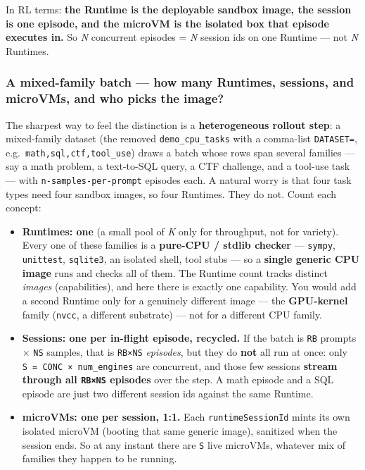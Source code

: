 \documentclass[
  paper=a4,
  ,captions=tableheading
]{scrartcl}
\providecommand{\tightlist}{%
  \setlength{\itemsep}{0pt}\setlength{\parskip}{0pt}}
\begin{document}
In RL terms: \textbf{the Runtime is the deployable sandbox image, the
session is one episode, and the microVM is the isolated box that episode
executes in.} So \emph{N} concurrent episodes = \emph{N} session ids on
one Runtime --- not \emph{N} Runtimes.

\hypertarget{a-mixed-family-batch-how-many-runtimes-sessions-and-microvms-and-who-picks-the-image}{%
\subsubsection{A mixed-family batch --- how many Runtimes, sessions, and
microVMs, and who picks the
image?}\label{a-mixed-family-batch-how-many-runtimes-sessions-and-microvms-and-who-picks-the-image}}

The sharpest way to feel the distinction is a \textbf{heterogeneous
rollout step}: a mixed-family dataset (the removed
\texttt{demo\_cpu\_tasks} with a comma-list \texttt{DATASET=},
e.g.~\texttt{math,sql,ctf,tool\_use}) draws a batch whose rows span
several families --- say a math problem, a text-to-SQL query, a CTF
challenge, and a tool-use task --- with \texttt{n-samples-per-prompt}
episodes each. A natural worry is that four task types need four sandbox
images, so four Runtimes. They do not. Count each concept:

\begin{itemize}
\tightlist
\item
  \textbf{Runtimes: one} (a small pool of \emph{K} only for throughput,
  not for variety). Every one of these families is a \textbf{pure-CPU /
  stdlib checker} --- \texttt{sympy}, \texttt{unittest},
  \texttt{sqlite3}, an isolated shell, tool stubs --- so a
  \textbf{single generic CPU image} runs and checks all of them. The
  Runtime count tracks distinct \emph{images} (capabilities), and here
  there is exactly one capability. You would add a second Runtime only
  for a genuinely different image --- the \textbf{GPU-kernel} family
  (\texttt{nvcc}, a different substrate) --- not for a different CPU
  family.
\item
  \textbf{Sessions: one per in-flight episode, recycled.} If the batch
  is \texttt{RB} prompts × \texttt{NS} samples, that is \texttt{RB×NS}
  \emph{episodes}, but they do \textbf{not} all run at once: only
  \texttt{S\ =\ CONC\ ×\ num\_engines} are concurrent, and those few
  sessions \textbf{stream through all \texttt{RB×NS} episodes} over the
  step. A math episode and a SQL episode are just two different session
  ids against the same Runtime.
\item
  \textbf{microVMs: one per session, 1:1.} Each
  \texttt{runtimeSessionId} mints its own isolated microVM (booting that
  same generic image), sanitized when the session ends. So at any
  instant there are \texttt{S} live microVMs, whatever mix of families
  they happen to be running.
\end{itemize}
\end{document}

